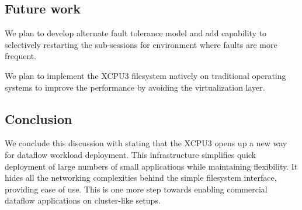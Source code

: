 \documentclass[conference]{IEEEtran}
\begin{document}
\subsection{Future work}
We plan to develop alternate fault tolerance model and add capability to
selectively restarting the sub-sessions for environment where
faults are more frequent.

We plan to implement the XCPU3 filesystem natively on traditional operating
systems to improve the performance by avoiding the virtualization layer.


\subsection{Conclusion}
We conclude this discussion with stating that the XCPU3 opens up a new way for
dataflow workload deployment.  This infrastructure simplifies quick deployment
of large numbers of small applications while maintaining flexibility. It
hides all the networking complexities behind the simple filesystem interface,
providing ease of use.  This is one more step towards enabling commercial
dataflow applications on cluster-like setups.




\end{document}
